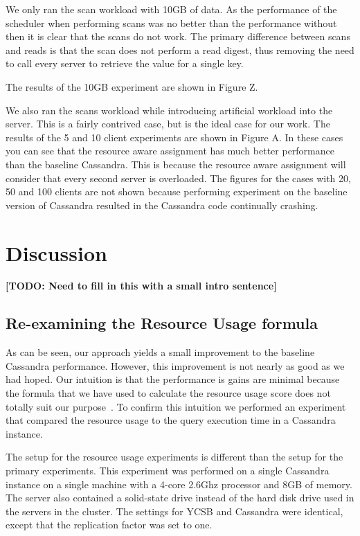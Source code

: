 \documentclass[]{acm_proc_article-sp}
\newcommand{\todo}[1]{\textbf{[TODO: #1]}}
\begin{document}
We only ran the scan workload with 10GB of data. As the performance of the scheduler when performing scans was no better than the performance without then it is clear that the scans do not work. The primary difference between scans and reads is that the scan does not perform a read digest, thus removing the need to call every server to retrieve the value for a single key.

The results of the 10GB experiment are shown in Figure Z.

We also ran the scans workload while introducing artificial workload into the server. This is a fairly contrived case, but is the ideal case for our work. The results of the 5 and 10 client experiments are shown in Figure A. In these cases you can see that the resource aware assignment has much better performance than the baseline Cassandra. This is because the resource aware assignment will consider that every second server is overloaded. The figures for the cases with 20, 50 and 100 clients are not shown because performing experiment on the baseline version of Cassandra resulted in the Cassandra code continually crashing.

\section{Discussion}
\todo{Need to fill in this with a small intro sentence}

\subsection{Re-examining the Resource Usage formula}
As can be seen, our approach yields a small improvement to the baseline Cassandra performance. However, this improvement is not nearly as good as we had hoped. Our intuition is that the performance is gains are minimal because the formula that we have used to calculate the resource usage score does not totally suit our purpose~\cite{Gray and Black Box}. To confirm this intuition we performed an experiment that compared the resource usage to the query execution time in a Cassandra instance. 

The setup for the resource usage experiments is different than the setup for the primary experiments. This experiment was performed on a single Cassandra instance on a single machine with a 4-core 2.6Ghz processor and 8GB of memory. The server also contained a solid-state drive instead of the hard disk drive used in the servers in the cluster. The settings for YCSB and Cassandra were identical, except that the replication factor was set to one.
\end{document}

